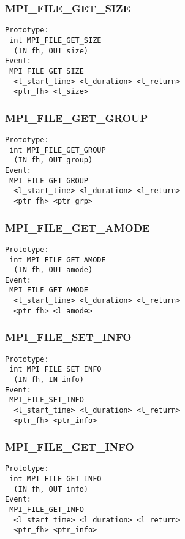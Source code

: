 \documentclass{article}
\begin{document}
\subsubsection{MPI\_FILE\_GET\_SIZE}
\label{sec:MPIFILEGETSIZE}
\begin{verbatim}
Prototype:
 int MPI_FILE_GET_SIZE
  (IN fh, OUT size)
Event:
 MPI_FILE_GET_SIZE 
  <l_start_time> <l_duration> <l_return>
  <ptr_fh> <l_size>
\end{verbatim}

\subsubsection{MPI\_FILE\_GET\_GROUP}
\label{sec:MPIFILEGETGROUP}
\begin{verbatim}
Prototype:
 int MPI_FILE_GET_GROUP
  (IN fh, OUT group)
Event:
 MPI_FILE_GET_GROUP 
  <l_start_time> <l_duration> <l_return>
  <ptr_fh> <ptr_grp>
\end{verbatim}

\subsubsection{MPI\_FILE\_GET\_AMODE}
\label{sec:MPIFILEGETAMODE}
\begin{verbatim}
Prototype:
 int MPI_FILE_GET_AMODE
  (IN fh, OUT amode)
Event:
 MPI_FILE_GET_AMODE 
  <l_start_time> <l_duration> <l_return>
  <ptr_fh> <l_amode>
\end{verbatim}

\subsubsection{MPI\_FILE\_SET\_INFO}
\label{sec:MPIFILESETINFO}
\begin{verbatim}
Prototype:
 int MPI_FILE_SET_INFO
  (IN fh, IN info)
Event:
 MPI_FILE_SET_INFO 
  <l_start_time> <l_duration> <l_return>
  <ptr_fh> <ptr_info>
\end{verbatim}

\subsubsection{MPI\_FILE\_GET\_INFO}
\label{sec:MPIFILEGETINFO}
\begin{verbatim}
Prototype:
 int MPI_FILE_GET_INFO
  (IN fh, OUT info)
Event:
 MPI_FILE_GET_INFO 
  <l_start_time> <l_duration> <l_return>
  <ptr_fh> <ptr_info>
\end{verbatim}
\end{document}
